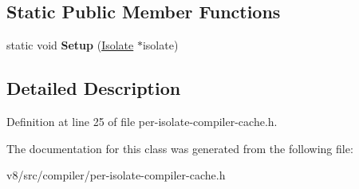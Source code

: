 \subsection*{Static Public Member Functions}
\begin{DoxyCompactItemize}
\item 
\mbox{\label{classv8_1_1internal_1_1compiler_1_1PerIsolateCompilerCache_a4d7960bbd92d96da519c56be1840e9e9}} 
static void {\bfseries Setup} (\mbox{\hyperlink{classv8_1_1internal_1_1Isolate}{Isolate}} $\ast$isolate)
\end{DoxyCompactItemize}


\subsection{Detailed Description}


Definition at line 25 of file per-\/isolate-\/compiler-\/cache.\+h.



The documentation for this class was generated from the following file\+:\begin{DoxyCompactItemize}
\item 
v8/src/compiler/per-\/isolate-\/compiler-\/cache.\+h\end{DoxyCompactItemize}
